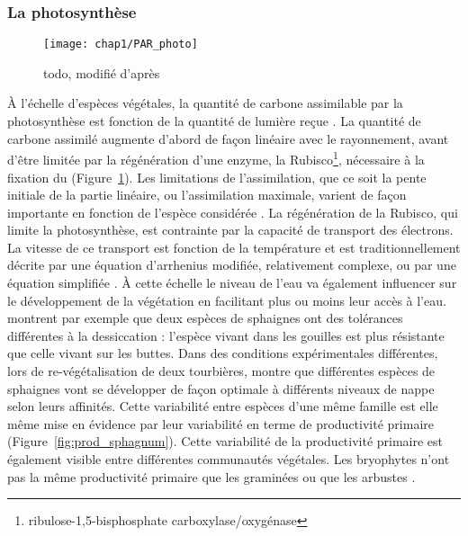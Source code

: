 \subsubsection{La photosynthèse}

\begin{figure}
\centering
\texttt{[image: chap1/PAR\_photo]}
\caption{todo, modifié d'après \citet{long1993}}
\label{fig:PAR_photo}
\end{figure}

À l'échelle d'espèces végétales, la quantité de carbone assimilable par la photosynthèse est fonction de la quantité de lumière reçue \citep{long1993}.
La quantité de carbone assimilé augmente d'abord de façon linéaire avec le rayonnement, avant d'être limitée par la régénération d'une enzyme, la Rubisco\footnote{ribulose-1,5-bisphosphate carboxylase/oxygénase}, nécessaire à la fixation du \coo (Figure~\ref{fig:PAR_photo}).
Les limitations de l'assimilation, que ce soit la pente initiale de la partie linéaire, ou l'assimilation maximale, varient de façon importante en fonction de l'espèce considérée \citep{wullschleger1993}.
La régénération de la Rubisco, qui limite la photosynthèse, est contrainte par la capacité de transport des électrons.
La vitesse de ce transport est fonction de la température et est traditionnellement décrite par une équation d'arrhenius modifiée, relativement complexe, ou par une équation simplifiée \citep{farquhar1980,june2004}.
À cette échelle le niveau de l'eau va également influencer sur le développement de la végétation en facilitant plus ou moins leur accès à l'eau.
\citet{wagner1984} montrent par exemple que deux espèces de sphaignes ont des tolérances différentes à la dessiccation : l'espèce vivant dans les gouilles est plus résistante que celle vivant sur les buttes.
Dans des conditions expérimentales différentes, lors de re-végétalisation de deux tourbières, \cite{robroek2009} montre que différentes espèces de sphaignes vont se développer de façon optimale à différents niveaux de nappe selon leurs affinités.
Cette variabilité entre espèces d'une même famille est elle même mise en évidence par leur variabilité en terme de productivité primaire (Figure~\ref{fig:prod_sphagnum}).
Cette variabilité de la productivité primaire est également visible entre différentes communautés végétales.
Les bryophytes n'ont pas la même productivité primaire que les graminées ou que les arbustes \citetext{\citealp{moore2002} dans \citealp{rydin2013b}}.
